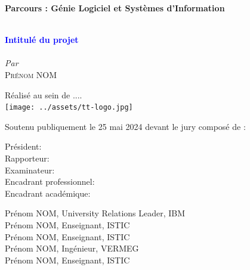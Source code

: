 \begin{titlepage}
\textbf{Parcours : Génie Logiciel et Systèmes d'Information}

\vskip1cm%


\HRule \\[0.4cm]
\textcolor{blue}{ \LARGE \bfseries Intitulé du projet}\\[0.4cm] %
\HRule \\[1cm]

\vskip0.5cm%
\textit{Par}\\
\textsc{\large Prénom NOM}\\[0.5cm] %
\vskip0.5cm%

{Réalisé au sein de ....}\\
\texttt{[image: ../assets/tt-logo.jpg]}\\

\vskip1cm
 
 \begin{flushleft}
Soutenu publiquement le 25 mai 2024 devant le jury composé de :
\smallskip

\begin{minipage}[c]{0.3\columnwidth}
Président:\\
Rapporteur:\\
Examinateur:\\
Encadrant professionnel:\\
Encadrant académique:
\end{minipage}
\begin{minipage}[c]{0.6\columnwidth}
Prénom NOM, University Relations Leader, IBM\\
Prénom NOM, Enseignant, ISTIC\\
Prénom NOM, Enseignant, ISTIC\\
Prénom NOM, Ingénieur, VERMEG\\
Prénom NOM, Enseignant, ISTIC
\end{minipage}
 \end{flushleft}


\end{titlepage}
